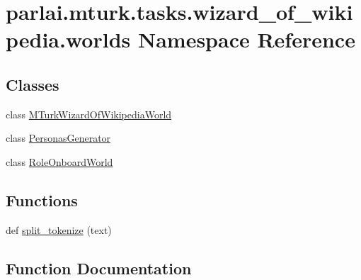 \hypertarget{namespaceparlai_1_1mturk_1_1tasks_1_1wizard__of__wikipedia_1_1worlds}{}\section{parlai.\+mturk.\+tasks.\+wizard\+\_\+of\+\_\+wikipedia.\+worlds Namespace Reference}
\label{namespaceparlai_1_1mturk_1_1tasks_1_1wizard__of__wikipedia_1_1worlds}
\subsection*{Classes}
\begin{DoxyCompactItemize}
\item 
class \hyperlink{classparlai_1_1mturk_1_1tasks_1_1wizard__of__wikipedia_1_1worlds_1_1MTurkWizardOfWikipediaWorld}{M\+Turk\+Wizard\+Of\+Wikipedia\+World}
\item 
class \hyperlink{classparlai_1_1mturk_1_1tasks_1_1wizard__of__wikipedia_1_1worlds_1_1PersonasGenerator}{Personas\+Generator}
\item 
class \hyperlink{classparlai_1_1mturk_1_1tasks_1_1wizard__of__wikipedia_1_1worlds_1_1RoleOnboardWorld}{Role\+Onboard\+World}
\end{DoxyCompactItemize}
\subsection*{Functions}
\begin{DoxyCompactItemize}
\item 
def \hyperlink{namespaceparlai_1_1mturk_1_1tasks_1_1wizard__of__wikipedia_1_1worlds_a040aaf5ecfbddec14f321279454f85a8}{split\+\_\+tokenize} (text)
\end{DoxyCompactItemize}


\subsection{Function Documentation}
\mbox{\label{namespaceparlai_1_1mturk_1_1tasks_1_1wizard__of__wikipedia_1_1worlds_a040aaf5ecfbddec14f321279454f85a8}} 
